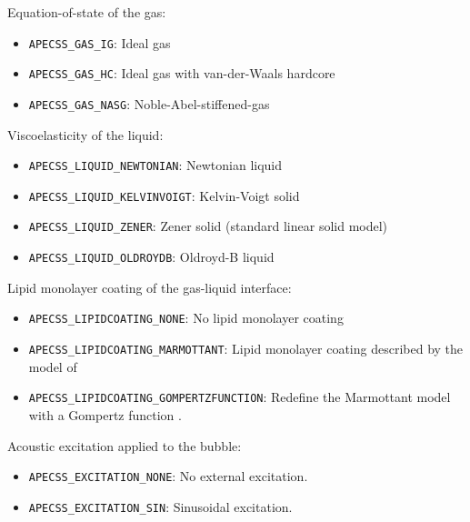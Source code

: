 Equation-of-state of the gas:\vspace{-1em}
\begin{itemize}[noitemsep]
  \item {\tt APECSS\_GAS\_IG}: Ideal gas 
  \item {\tt APECSS\_GAS\_HC}: Ideal gas with van-der-Waals hardcore
  \item {\tt APECSS\_GAS\_NASG}: Noble-Abel-stiffened-gas 
\end{itemize}

Viscoelasticity of the liquid:\vspace{-1em}
\begin{itemize}[noitemsep]
  \item {\tt APECSS\_LIQUID\_NEWTONIAN}: Newtonian liquid
  \item {\tt APECSS\_LIQUID\_KELVINVOIGT}: Kelvin-Voigt solid
  \item {\tt APECSS\_LIQUID\_ZENER}: Zener solid (standard linear solid model)
  \item {\tt APECSS\_LIQUID\_OLDROYDB}: Oldroyd-B liquid
\end{itemize}

Lipid monolayer coating of the gas-liquid interface:\vspace{-1em}
\begin{itemize}[noitemsep]
  \item {\tt APECSS\_LIPIDCOATING\_NONE}: No lipid monolayer coating
  \item {\tt APECSS\_LIPIDCOATING\_MARMOTTANT}: Lipid monolayer coating described by the model of \citet{Marmottant2005}
  \item {\tt APECSS\_LIPIDCOATING\_GOMPERTZFUNCTION}: Redefine the Marmottant model with a Gompertz function \citep{Guemmer2021}.
\end{itemize}

Acoustic excitation applied to the bubble:\vspace{-1em}
\begin{itemize}[noitemsep]
  \item {\tt APECSS\_EXCITATION\_NONE}: No external excitation. 
  \item {\tt APECSS\_EXCITATION\_SIN}: Sinusoidal excitation.
\end{itemize}

